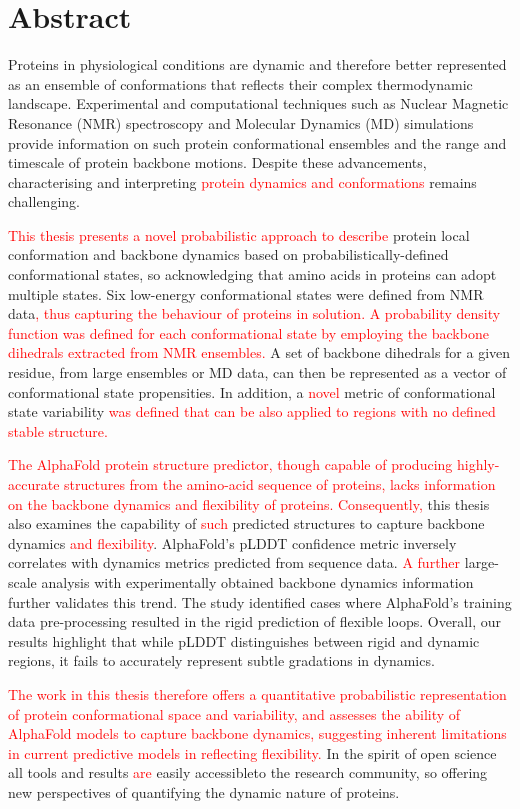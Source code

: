 \chapter*{Abstract}

Proteins in physiological conditions are dynamic and therefore better represented as an ensemble of conformations that reflects their complex thermodynamic landscape. Experimental and computational techniques such as Nuclear Magnetic Resonance (NMR) spectroscopy and Molecular Dynamics (MD) simulations provide information on such protein conformational ensembles and the range and timescale of protein backbone motions. Despite these advancements, characterising and interpreting \textcolor{red}{protein dynamics and conformations} remains challenging.

\textcolor{red}{This thesis presents a novel probabilistic approach to describe} protein local conformation and backbone dynamics based on probabilistically-defined conformational states, so acknowledging that amino acids in proteins can adopt multiple states. Six low-energy conformational states were defined from NMR data\textcolor{red}{, thus capturing the behaviour of proteins in solution. A probability density function was defined for each conformational state by employing the backbone dihedrals extracted from NMR ensembles.} A set of backbone dihedrals for a given residue, from large ensembles or MD data, can then be represented as a vector of conformational state propensities.  In addition, a \textcolor{red}{novel} metric of conformational state variability \textcolor{red}{was defined that can be also applied to regions with no defined stable structure.}

\textcolor{red}{The AlphaFold protein structure predictor, though capable of producing highly-accurate structures from the amino-acid sequence of proteins, lacks information on the backbone dynamics and flexibility of proteins. Consequently,}
 this thesis also examines the capability of \textcolor{red}{such} predicted structures to capture backbone dynamics \textcolor{red}{and flexibility}. AlphaFold's pLDDT confidence metric inversely correlates with dynamics metrics predicted from sequence data. \textcolor{red}{A further} large-scale analysis with experimentally obtained backbone dynamics information further validates this trend. The study identified cases where AlphaFold’s training data pre-processing resulted in the rigid prediction of flexible loops. Overall, our results highlight that while pLDDT distinguishes between rigid and dynamic regions, it fails to accurately represent subtle gradations in dynamics.
 
\textcolor{red}{The work in this thesis therefore offers a quantitative probabilistic representation of protein conformational space and variability, and  assesses the ability of AlphaFold models to capture backbone dynamics, suggesting inherent limitations in current predictive models in reflecting flexibility.} In the spirit of open science all tools and results \textcolor{red}{are} easily accessibleto the research community, so offering new perspectives of quantifying the dynamic nature of proteins.